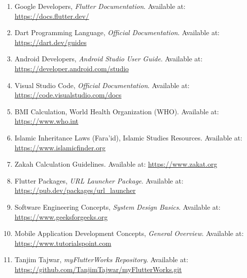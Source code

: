 \documentclass{article}
\begin{document}

\begin{enumerate}

\item Google Developers, \textit{Flutter Documentation}. Available at: \url{https://docs.flutter.dev/}

\item Dart Programming Language, \textit{Official Documentation}. Available at: \url{https://dart.dev/guides}

\item Android Developers, \textit{Android Studio User Guide}. Available at: \url{https://developer.android.com/studio}

\item Visual Studio Code, \textit{Official Documentation}. Available at: \url{https://code.visualstudio.com/docs}

\item BMI Calculation, World Health Organization (WHO). Available at: \url{https://www.who.int}

\item Islamic Inheritance Laws (Fara’id), Islamic Studies Resources. Available at: \url{https://www.islamicfinder.org}

\item Zakah Calculation Guidelines. Available at: \url{https://www.zakat.org}

\item Flutter Packages, \textit{URL Launcher Package}. Available at: \url{https://pub.dev/packages/url_launcher}

\item Software Engineering Concepts, \textit{System Design Basics}. Available at: \url{https://www.geeksforgeeks.org}

\item Mobile Application Development Concepts, \textit{General Overview}. Available at: \url{https://www.tutorialspoint.com}

\item Tanjim Tajwar, \textit{myFlutterWorks Repository}. Available at: \url{https://github.com/TanjimTajwar/myFlutterWorks.git}

\end{enumerate}








\end{document}
